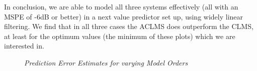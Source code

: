 \documentclass[./main.tex]{subfiles}
\begin{document}
In conclusion, we are able to model all three systems effectively (all with an MSPE of -6dB or better) in a next value predictor set up, using widely linear filtering. We find that in all three cases the ACLMS does outperform the CLMS, at least for the optimum values (the minimum of these plots) which we are interested in.

\begin{figure}[h]
	\centering
	\setlength{}
	\setlength{}
	\resizebox{\textwidth}{!}{}
	\caption{\textit{Prediction Error Estimates for varying Model Orders}}
	\label{fig:4_1_b_order}
\end{figure}




%  	


 		
         
 		
\end{document}
